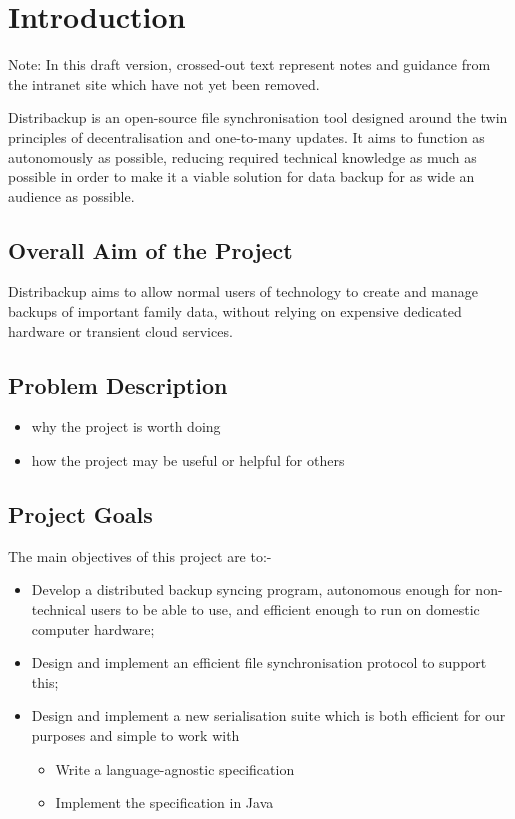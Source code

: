 \documentclass[12pt,a4paper,]{adreport}
\author{}
\date{}
\begin{document}
{
\hypersetup{linkcolor=black}
\setcounter{tocdepth}{2}
\tableofcontents
}
\chapter{Introduction}\label{introduction}

Note: In this draft version, crossed-out text represent notes and
guidance from the intranet site which have not yet been removed.

Distribackup is an open-source file synchronisation tool designed around
the twin principles of decentralisation and one-to-many updates. It aims
to function as autonomously as possible, reducing required technical
knowledge as much as possible in order to make it a viable solution for
data backup for as wide an audience as possible.

\section{Overall Aim of the Project}\label{overall-aim-of-the-project}

Distribackup aims to allow normal users of technology to create and
manage backups of important family data, without relying on expensive
dedicated hardware or transient cloud services.

\section{Problem Description}\label{problem-description}

\begin{itemize}
\itemsep1pt\parskip0pt
\item
  why the project is worth doing
\item
  how the project may be useful or helpful for others
\end{itemize}

\section{Project Goals}\label{project-goals}

The main objectives of this project are to:-

\begin{itemize}
\itemsep1pt\parskip0pt
\item
  Develop a distributed backup syncing program, autonomous enough for
  non-technical users to be able to use, and efficient enough to run on
  domestic computer hardware;
\item
  Design and implement an efficient file synchronisation protocol to
  support this;
\item
  Design and implement a new serialisation suite which is both efficient
  for our purposes and simple to work with

  \begin{itemize}
  \itemsep1pt\parskip0pt
  \item
    Write a language-agnostic specification
  \item
    Implement the specification in Java
  \end{itemize}
\end{itemize}
\end{document}
